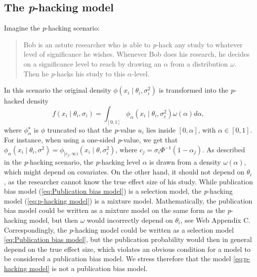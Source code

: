 \documentclass[useAMS,usenatbib,referee]{biom}
\begin{document}
\subsection{The \textit{p}-hacking model}\label{subsect:p-hacking}
Imagine the \textit{p}-hacking scenario:
\begin{quote}
Bob is an astute researcher who is able to \textit{p}-hack any study to whatever level of significance he wishes. Whenever Bob does his research, he decides on a significance level to reach by drawing an $\alpha$ from a distribution $\omega$. Then he \textit{p}-hacks his study to this $\alpha$-level.
\end{quote}
In this scenario the original density $\phi(x_{i}\mid\theta_{i},\sigma^2_{i})$
is transformed into the \textit{p}-hacked density
\begin{equation}\label{eq:p-hacking model}
f(x_{i}\mid\theta_{i},\sigma_i)=\int_{[0,1]}\phi_\alpha(x_{i}\mid\theta_{i},\sigma^2_{i})\omega(\alpha)d\alpha,
\end{equation}
where $\phi_\alpha^{\star}$ is $\phi$ truncated so that the \textit{p}-value $u_i$ lies inside $\left[0,\alpha\right]$, with $\alpha \in [0,1]$. For instance, when using a one-sided \textit{p}-value, we get that $\phi_\alpha(x_i \mid \theta_i, \sigma^2) = \phi_{[c_j,\infty)}(x_{i}\mid\theta,\sigma_{i}^2)$, where $c_{j}=\sigma_i\Phi^{-1}(1-\alpha_{j})$.
As described in the \textit{p}-hacking scenario, the \textit{p}-hacking level $\alpha$ is drawn from a density $\omega(\alpha)$, which might depend on covariates. On the other hand, it should not depend on $\theta_{i}$, as the researcher cannot know the true effect size of his study.
While publication bias model (\ref{eq:Publication bias model}) is a selection model, the \textit{p}-hacking model (\ref{eq:p-hacking model}) is a mixture model.
Mathematically, the publication bias model could be written as a mixture model on the same form as the \textit{p}-hacking model, but then $\omega$ would incorrectly depend on $\theta_i$, see Web Appendix C. Correspondingly, the \textit{p}-hacking model could be written as a selection model \eqref{eq:Publication bias model}, but the publication probability would then in general depend on the true effect size, which violates an obvious condition for a model to be considered a publication bias model. We stress therefore that the model \eqref{eq:p-hacking model} is not a publication bias model.
\end{document}
